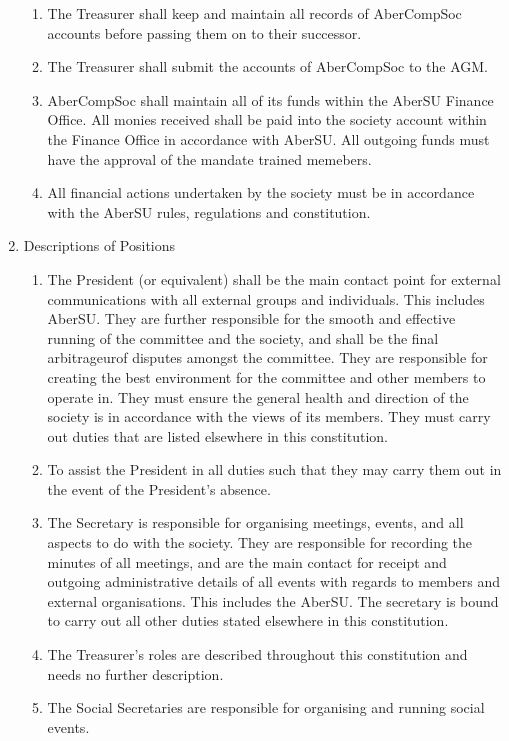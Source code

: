 \documentclass{article}
\begin{document}
\begin{enumerate}
\begin{enumerate}
            \item The Treasurer shall keep and maintain all records of AberCompSoc accounts before passing them on to their successor.
            \item The Treasurer shall submit the accounts of AberCompSoc to the AGM.
            \item AberCompSoc shall maintain all of its funds within the AberSU Finance Office. All monies received shall be paid into the society account within the Finance Office in accordance with AberSU. All outgoing funds must have the approval of the mandate trained memebers.
            \item All financial actions undertaken by the society must be in accordance with the AberSU rules, regulations and constitution.
        \end{enumerate}
    \item Descriptions of Positions
        \begin{enumerate}
            \item The President (or equivalent) shall be the main contact point for external communications with all external groups and individuals. This includes AberSU. They are further responsible for the smooth and effective running of the committee and the society, and shall be the final arbitrageurof disputes amongst the committee. They are responsible for creating the best environment for the committee and other members to operate in. They must ensure the general health and direction of the society is in accordance with the views of its members. They must carry out duties that are listed elsewhere in this constitution.
            \item To assist the President in all duties such that they may carry them out in the event of the President's absence.
            \item The Secretary is responsible for organising meetings, events, and all aspects to do with the society. They are responsible for recording the minutes of all meetings, and are the main contact for receipt and outgoing administrative details of all events with regards to members and external organisations. This includes the AberSU. The secretary is bound to carry out all other duties stated elsewhere in this constitution.
            \item The Treasurer’s roles are described throughout this constitution and needs no further description.
            \item The Social Secretaries are responsible for organising and running social events.

\end{enumerate}
\end{enumerate}
\end{document}
